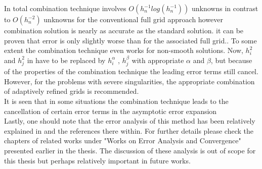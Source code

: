 In total combination technique involves $O({h}^{-1}_nlog({h}^{-1}_n))$  unknowns in contrast to $O({h}^{-2}_n) $ unknowns for the conventional full grid approach however combination solution is nearly as accurate as the standard solution. it can be proven that error is only slightly worse than for the associated full grid.\cite{Griebel1992a, Griebel1992b}. To some extent the combination technique even works for non-smooth solutions. Now, ${h}^2_i$ and ${h}^2_j$ in have to be replaced by ${h}^\alpha_i$ , ${h}^\beta_j$ with appropriate $\alpha$ and $\beta$, but because of the properties of the combination technique the leading error terms still cancel. However, for the problems with severe singularities, the appropriate combination of adaptively refined grids is recommended.\cite{Griebel1992a}\\ It is seen that in some situations the combination technique leads to the cancellation of certain error terms in the asymptotic error expansion\cite{Griebel1992b} \\
 Lastly, one should note that the error analysis of this method has been relatively explained in \cite{Garcke2013} and the references there within. For further details please check the chapters of related works under "Works on Error Analysis and Convergence" presented earlier in the thesis. The discussion of these analysis is out of scope for this thesis but perhaps relatively important in future works.
%
%
